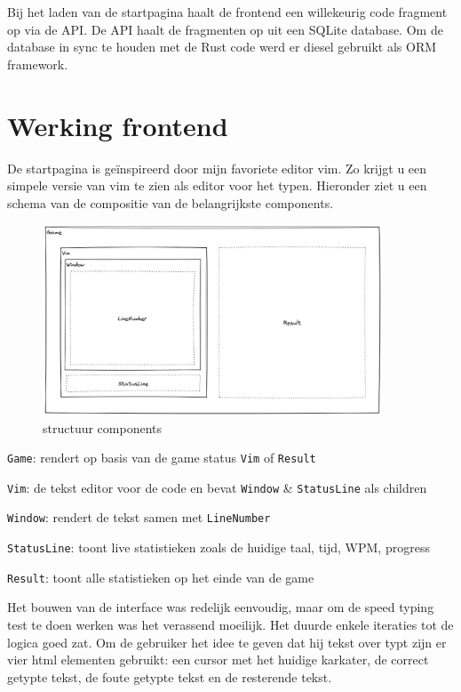 Bij het laden van de startpagina haalt de frontend een willekeurig code fragment op via de API. De
API haalt de fragmenten op uit een SQLite database. Om de database in sync te houden met de Rust
code werd er diesel gebruikt als ORM framework.


\clearpage

\section{Werking frontend}

De startpagina is geïnspireerd door mijn favoriete editor vim. Zo krijgt u een simpele versie van
vim te zien als editor voor het typen. Hieronder ziet u een schema van de compositie van de
belangrijkste components.

\begin{figure}[h]
  \centering
  \includegraphics[width=0.9\textwidth]{./figures/components.png}
  \caption{structuur components}
\end{figure}

\texttt{Game}: rendert op basis van de game status \texttt{Vim} of
\texttt{Result} 

\texttt{Vim}: de tekst editor voor de code en bevat \texttt{Window} \&
\texttt{StatusLine} als children 

\texttt{Window}: rendert de tekst samen met \texttt{LineNumber} 

\texttt{StatusLine}: toont live statistieken zoals de huidige taal, tijd, WPM, progress 

\texttt{Result}: toont alle statistieken op het einde van de game

Het bouwen van de interface was redelijk eenvoudig, maar om de speed typing test te doen werken was
het verassend moeilijk. Het duurde enkele iteraties tot de logica goed zat. Om de gebruiker het idee
te geven dat hij tekst over typt zijn er vier html elementen gebruikt: een cursor met het huidige
karkater, de correct getypte tekst, de foute getypte tekst en de resterende tekst.

